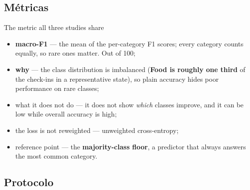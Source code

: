 \documentclass{beamer}
\begin{document}
\subsection{Métricas}

\begin{frame}{The metric all three studies share}
    \begin{itemize}\setlength{\itemsep}{5pt}
        \item \textbf{macro-F1} --- the mean of the per-category F1 scores; every category counts
              equally, so rare ones matter. Out of 100;
        \item \textbf{why} --- the class distribution is imbalanced (\textbf{Food is roughly one
              third} of the check-ins in a representative state), so plain accuracy hides poor
              performance on rare classes;
        \item \alert{what it does not do} --- it does not show \emph{which} classes improve, and
              it can be low while overall accuracy is high;
        \item \alert{the loss is not reweighted} --- unweighted cross-entropy;
        \item reference point --- the \textbf{majority-class floor}, a predictor that always
              answers the most common category.
    \end{itemize}
\end{frame}

\subsection{Protocolo}
\end{document}
